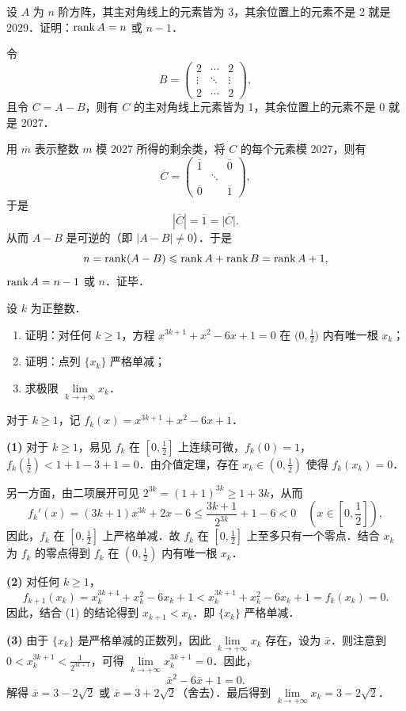 设 $A$ 为 $n$ 阶方阵，其主对角线上的元素皆为 3，其余位置上的元素不是 2 就是 2029．证明：$\operatorname{rank} A=n$ 或 $n-1$．
\begin{solution}
令
\[
  B=\begin{pmatrix}2&\cdots&2\\ \vdots&\ddots&\vdots\\ 2&\cdots&2\end{pmatrix},
\]
且令 $C=A-B$，则有 $C$ 的主对角线上元素皆为 1，其余位置上的元素不是 0 就是 2027．

用 $\overline{m}$ 表示整数 $m$ 模 2027 所得的剩余类，将 $C$ 的每个元素模 2027，则有
\[
  \overline{C}=\begin{pmatrix}\overline{1}& & \overline{0}\\ & \ddots & \\ \overline{0} & & \overline{1}\end{pmatrix},
\]
于是
\[
  |\overline{C}|=\overline{1}=\overline{|C|}.
\]
从而 $A-B$ 是可逆的（即 $|A-B|\neq 0$）．于是
\[
  n=\operatorname{rank}(A-B)\leqslant \operatorname{rank} A+\operatorname{rank} B=\operatorname{rank} A+1,
\]
$\operatorname{rank} A=n-1$ 或 $n$．证毕．
\end{solution}

设 $k$ 为正整数．
\begin{enumerate}[label=(\arabic*)]
  \item 证明：对任何 $k\geqslant 1$，方程 $x^{3k+1}+x^2-6x+1=0$ 在 $\bigl(0,\frac{1}{2}\bigr)$ 内有唯一根 $x_k$；
  \item 证明：点列 $\{x_k\}$ 严格单减；
  \item 求极限 $\lim\limits_{k\to+\infty}x_k$．
\end{enumerate}
\begin{solution}
对于 $k\geqslant 1$，记 $f_k(x)=x^{3k+1}+x^2-6x+1$．

\textbf{(1)} 对于 $k\geqslant 1$，易见 $f_k$ 在 $\left[0,\frac{1}{2}\right]$ 上连续可微，$f_k(0)=1$，$f_k\left(\frac{1}{2}\right)<1+1-3+1=0$．由介值定理，存在 $x_k\in\left(0,\frac{1}{2}\right)$ 使得 $f_k(x_k)=0$．

另一方面，由二项展开可见 $2^{3k}=(1+1)^{3k}\geqslant 1+3k$，从而
\[
  f_k'(x)=(3k+1)x^{3k}+2x-6\leqslant\frac{3k+1}{2^{3k}}+1-6<0
  \quad \left(x\in\left[0,\frac{1}{2}\right]\right),
\]
因此，$f_k$ 在 $\left[0,\frac{1}{2}\right]$ 上严格单减．故 $f_k$ 在 $\left[0,\frac{1}{2}\right]$ 上至多只有一个零点．结合 $x_k$ 为 $f_k$ 的零点得到 $f_k$ 在 $\left(0,\frac{1}{2}\right)$ 内有唯一根 $x_k$．

\textbf{(2)} 对任何 $k\geqslant 1$，
\[
  f_{k+1}(x_k)=x_k^{3k+4}+x_k^2-6x_k+1<x_k^{3k+1}+x_k^2-6x_k+1=f_k(x_k)=0.
\]
因此，结合 (1) 的结论得到 $x_{k+1}<x_k$．即 $\{x_k\}$ 严格单减．

\textbf{(3)} 由于 $\{x_k\}$ 是严格单减的正数列，因此 $\lim\limits_{k\to+\infty}x_k$ 存在，设为 $\bar{x}$．则注意到 $0<x_k^{3k+1}<\frac{1}{2^{3k+1}}$，可得 $\lim\limits_{k\to+\infty}x_k^{3k+1}=0$．因此，
\[
  \bar{x}^2-6\bar{x}+1=0.
\]
解得 $\bar{x}=3-2\sqrt{2}$ 或 $\bar{x}=3+2\sqrt{2}$（舍去）．最后得到 $\lim\limits_{k\to+\infty}x_k=3-2\sqrt{2}$．
\end{solution}

